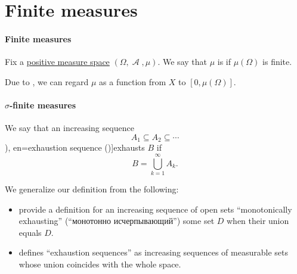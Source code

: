 \section{Finite measures}\label{sec:finite_measures}

\paragraph{Finite measures}

\begin{definition}\label{def:finite_measure}
  Fix a \hyperref[def:measure_space/positive]{positive measure space} \( (\Omega, \mscrA, \mu) \). We say that \( \mu \) is  if \( \mu(\Omega) \) is finite.

  Due to , we can regard \( \mu \) as a function from \( X \) to \( [0, \mu(\Omega)] \).
\end{definition}

\paragraph{\( \sigma \)-finite measures}

\begin{definition}\label{def:exhausting_sequence}\mimprovised
  We say that an increasing sequence
  \begin{equation*}
    A_1 \subseteq A_2 \subseteq \cdots
  \end{equation*}
  \term[ru=монотонно исчерпывает (\cite[def. 3.8.1]{ИльинСадовничийСендов1987АнализТом2}), en=exhaustion sequence (\cite[13]{Malliavin1995Probability})]{exhausts} \( B \) if
  \begin{equation*}
    B = \bigcup_{k=1}^\infty A_k.
  \end{equation*}
\end{definition}
\begin{comments}
  \item We generalize our definition from the following:
  \begin{itemize}
    \item {} provide a definition for an increasing sequence of open sets \enquote{monotonically exhausting} (\enquote{монотонно исчерпывающий}) some set \( D \) when their union equals \( D \).

    \item {} defines \enquote{exhaustion sequences} as increasing sequences of measurable sets whose union coincides with the whole space.
  \end{itemize}
\end{comments}

